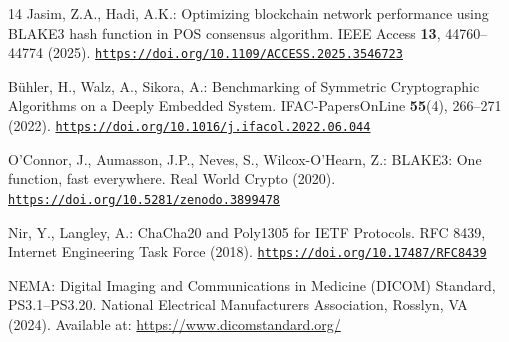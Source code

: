 \documentclass[runningheads]{llncs}
\newcommand{\doi}[1]{\mbox{\href{https://doi.org/#1}{\texttt{https://doi.org/#1}}}}
\begin{document}
\begin{thebibliography}{14}
Jasim, Z.A., Hadi, A.K.: Optimizing blockchain network performance using BLAKE3
hash function in POS consensus algorithm. IEEE Access \textbf{13}, 44760--44774 (2025).
\doi{10.1109/ACCESS.2025.3546723}

Bühler, H., Walz, A., Sikora, A.: Benchmarking of Symmetric Cryptographic
Algorithms on a Deeply Embedded System. IFAC-PapersOnLine \textbf{55}(4),
266--271 (2022). \doi{10.1016/j.ifacol.2022.06.044}

O'Connor, J., Aumasson, J.P., Neves, S., Wilcox-O'Hearn, Z.: BLAKE3: One
function, fast everywhere. Real World Crypto (2020). \doi{10.5281/zenodo.3899478}

Nir, Y., Langley, A.: ChaCha20 and Poly1305 for IETF Protocols. RFC 8439,
Internet Engineering Task Force (2018). \doi{10.17487/RFC8439}

NEMA: Digital Imaging and Communications in Medicine (DICOM) Standard,
PS3.1--PS3.20. National Electrical Manufacturers Association, Rosslyn, VA (2024).
Available at: \url{https://www.dicomstandard.org/}

\end{thebibliography}
\end{document}
